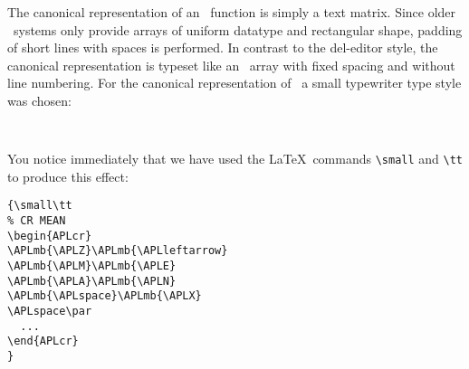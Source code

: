  

The canonical representation of an \APL\ function is simply a text
matrix. Since older \APL\ systems only provide arrays of uniform
datatype and rectangular shape, padding of short lines with spaces is
performed. In contrast to the del-editor style, the canonical
representation is typeset like an \APL\ array with fixed spacing and
without line numbering. For the 
canonical representation of \APLM\APLE\APLA\APLN\ a small typewriter
type style was chosen:
 
%
 
{\small\tt
\begin{APLcr}
\APLmb{\APLZ}\APLmb{\APLleftarrow}\APLmb{\APLM}\APLmb{\APLE}
\APLmb{\APLA}\APLmb{\APLN}\APLmb{\APLspace}\APLmb{\APLX}
\APLspace\par
\APLmb{\APLZ}\APLmb{\APLleftarrow}\APLmb{\APLleftparen}
\APLmb{\APLplus}\APLmb{\APLslash}\APLmb{\APLX}\APLmb{
\APLrightparen}\APLmb{\APLdivide}\APLmb{\APLrho}\APLmb{\APLX}
\APLspace\par
\end{APLcr}
}

 
You notice immediately that we have used the \LaTeX\ commands
\verb+\small+ and \verb+\tt+ to produce this effect:
 
\begin{verbatim}
{\small\tt
% CR MEAN
\begin{APLcr}
\APLmb{\APLZ}\APLmb{\APLleftarrow}
\APLmb{\APLM}\APLmb{\APLE}
\APLmb{\APLA}\APLmb{\APLN}
\APLmb{\APLspace}\APLmb{\APLX}
\APLspace\par
  ...
\end{APLcr}
}
\end{verbatim}
%
 
